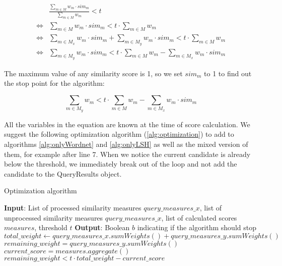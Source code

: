 \begin{align*}
   & \frac{\sum_{m \in M} w_m \cdot sim_m}{\sum_{m \in M} w_m} < t \\
   \iff & \sum_{m \in M} w_m \cdot sim_m < t \cdot \sum_{m \in M} w_m \\
   \iff & \sum_{m \in M_x} w_m \cdot sim_m + \sum_{m \in M_y} w_m \cdot sim_m < t \cdot \sum_{m \in M} w_m \\
   \iff & \sum_{m \in M_y} w_m \cdot sim_m < t \cdot \sum_{m \in M} w_m - \sum_{m \in M_x} w_m \cdot sim_m
\end{align*}

The maximum value of any similarity score is 1, so we set $sim_m$ to 1 to find out the stop point for the algorithm:

\[\sum_{m \in M_y} w_m < t \cdot \sum_{m \in M} w_m - \sum_{m \in M_x} w_m \cdot sim_m\]

All the variables in the equation are known at the time of score calculation. We suggest the following optimization algorithm (\ref{alg:optimization}) to add to algorithms \ref{alg:onlyWordnet} and \ref{alg:onlyLSH} as well as the mixed version of them, for example after line 7. When we notice the current candidate is already below the threshold, we immediately break out of the loop and not add the candidate to the QueryResults object. 

\begin{algorithm}
    \caption{Optimization algorithm}
    \label{alg:optimization}
    \begin{algorithmic}[1]
\STATE \textbf{Input}: List of processed similarity measures $query\_measures\_x$, list of unprocessed similarity measures $query\_measures\_x$, list of calculated scores $measures$, threshold $t$
\STATE \textbf{Output}: Boolean $b$ indicating if the algorithm should stop
\STATE $total\_weight \gets query\_measures\_x.sumWeights() + query\_measures\_y.sumWeights()$
\STATE $remaining\_weight = query\_measures\_y.sumWeights()$
\STATE $current\_score = measures.aggregate()$
\RETURN $remaining\_weight < t \cdot total\_weight - current\_score$
    \end{algorithmic}
\end{algorithm}
